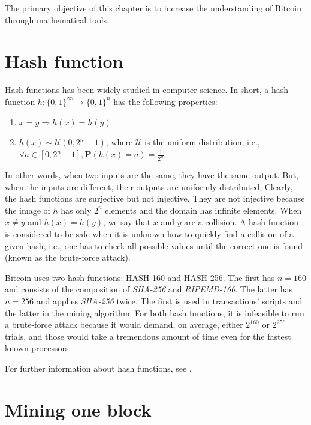 
The primary objective of this chapter is to increase the understanding of Bitcoin through mathematical tools.

\section{Hash function}

Hash functions has been widely studied in computer science. In short, a hash function $h: \{0, 1\}^\infty \rightarrow \{0, 1\}^{n}$ has the following properties:

\begin{enumerate}
	\item $x = y \Rightarrow h(x) = h(y)$
	\item $h(x) \sim \mathcal{U}(0, 2^{n}-1)$, where $\mathcal{U}$ is the uniform distribution, i.e., $\forall a \in [0, 2^{n}-1], \mathbf{P}(h(x)=a) = \frac{1}{2^{n}}$
\end{enumerate}

In other words, when two inputs are the same, they have the same output. But, when the inputs are different, their outputs are uniformly distributed. Clearly, the hash functions are surjective but not injective. They are not injective because the image of $h$ has only $2^n$ elements and the domain has infinite elements. When $x \ne y$ and $h(x) = h(y)$, we say that $x$ and $y$ are a collision. A hash function is considered to be safe when it is unknown how to quickly find a collision of a given hash, i.e., one has to check all possible values until the correct one is found (known as the brute-force attack).

Bitcoin uses two hash functions: HASH-160 and HASH-256. The first has $n=160$ and consists of the composition of \textit{SHA-256} and \textit{RIPEMD-160}. The latter has $n=256$ and applies \textit{SHA-256} twice. The first is used in transactions' scripts and the latter in the mining algorithm. For both hash functions, it is infeasible to run a brute-force attack because it would demand, on average, either $2^{160}$ or $2^{256}$ trials, and those would take a tremendous amount of time even for the fastest known processors.

For further information about hash functions, see \citet{gilbert2003security, dobbertin1996ripemd}.


\section{Mining one block}


